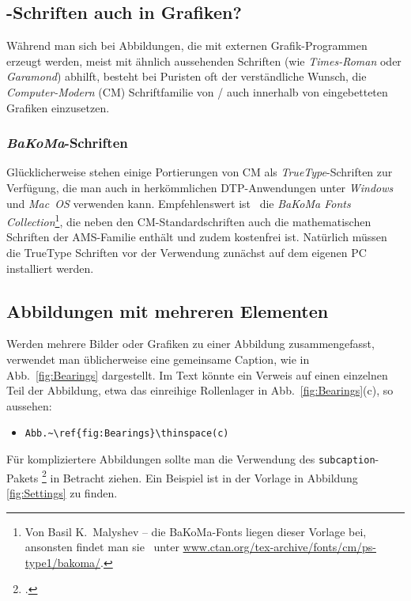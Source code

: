 \subsection{\tex-Schriften auch in Grafiken?}
\label{sec:tex-schriften-in-grafiken}

Während man sich bei Abbildungen, die mit externen
Grafik-Programmen erzeugt werden, meist mit ähnlich aussehenden
Schriften (wie \emph{Times-Roman} oder \emph{Garamond}) abhilft,
besteht bei Puristen oft der verständliche Wunsch, die 
\emph{Computer-Modern} (CM) Schriftfamilie von {\tex}/{\latex} auch
innerhalb von eingebetteten Grafiken einzusetzen.

\subsubsection{\emph{BaKoMa}-Schriften}

Glücklicherweise stehen einige Portierungen von CM als {\em
TrueType}-Schriften zur Verfügung, die man auch in herkömmlichen
DTP-Anwendungen unter \emph{Windows} und \emph{Mac~OS} verwenden
kann. Empfehlenswert ist \va\ die \emph{BaKoMa Fonts
Collection}\footnote{Von Basil K.\ Malyshev -- die BaKoMa-Fonts
liegen dieser Vorlage bei, ansonsten findet man sie \zB\ unter
\url{www.ctan.org/tex-archive/fonts/cm/ps-type1/bakoma/}.}, die
neben den CM-Standardschriften auch die mathematischen Schriften
der AMS-Familie ent\-hält und zudem kostenfrei ist. Natürlich
müssen die TrueType Schriften vor der Verwendung zunächst auf dem
eigenen PC installiert werden.


\subsection{Abbildungen mit mehreren Elementen}

Werden mehrere Bilder oder Grafiken zu einer Abbildung zusammengefasst, 
verwendet man üblicherweise eine gemeinsame Caption, wie in Abb.~\ref{fig:Bearings}
dargestellt. Im Text könnte ein Verweis auf einen einzelnen Teil der Abbildung, etwa das 
einreihige Rollenlager in Abb.~\ref{fig:Bearings}\thinspace(c), so aussehen:
%
\begin{itemize}
\item[] \verb!Abb.~\ref{fig:Bearings}\thinspace(c)! 
\end{itemize}
%
Für kompliziertere Abbildungen sollte man die Verwendung des 
\texttt{subcaption}-Pakets \footcite{Cochran95} in Betracht ziehen. Ein Beispiel ist in der Vorlage in Abbildung \ref{fig:Settings} zu finden.


